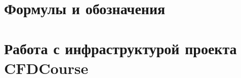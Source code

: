 \documentclass[a4paper,12pt]{article}
\numberwithin{equation}{section}
\begin{document}
\newpage
\tableofcontents
\newpage


































\appendix
\section{Формулы и обозначения}






\section{Работа с инфраструктурой проекта CFDCourse}





\end{document}
